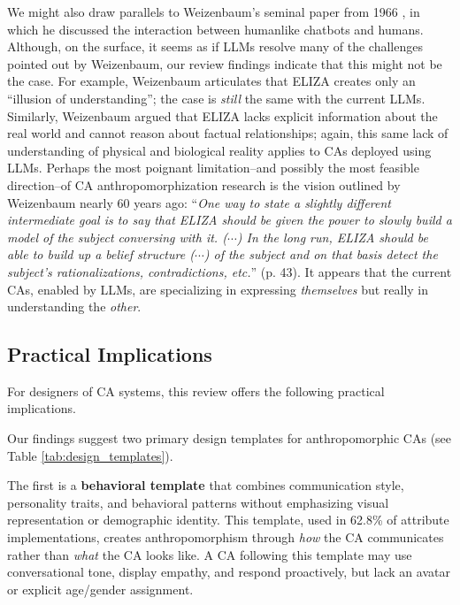 \documentclass[manuscript,anonymous,sigconf]{acmart}
\begin{document}
We might also draw parallels to Weizenbaum's seminal paper from 1966 \citep{weizenbaum_elizacomputer_1966}, in which he discussed the interaction between humanlike chatbots and humans. Although, on the surface, it seems as if LLMs resolve many of the challenges pointed out by Weizenbaum, our review findings indicate that this might not be the case. For example, Weizenbaum articulates that ELIZA creates only an ``illusion of understanding''; the case is \textit{still} the same with the current LLMs. Similarly, Weizenbaum argued that ELIZA lacks explicit information about the real world and cannot reason about factual relationships; again, this same lack of understanding of physical and biological reality applies to CAs deployed using LLMs. Perhaps the most poignant limitation--and possibly the most feasible direction--of CA anthropomorphization research is the vision outlined by Weizenbaum nearly 60 years ago: ``\textit{One way to state a slightly different intermediate goal is to say that ELIZA should be given the power to slowly build a model of the subject conversing with it. ($\cdots$) In the long run, ELIZA should be able to build up a belief structure ($\cdots$) of the subject and on that basis detect the subject's rationalizations, contradictions, etc.}'' (p. 43). It appears that the current CAs, enabled by LLMs, are specializing in expressing \textit{themselves} but really in understanding the \textit{other}.



\subsection{Practical Implications}

For designers of CA systems, this review offers the following practical implications.

Our findings suggest two primary design templates for anthropomorphic CAs (see Table \ref{tab:design_templates}). 

The first is a \textbf{behavioral template} that combines communication style, personality traits, and behavioral patterns without emphasizing visual representation or demographic identity. This template, used in 62.8\% of attribute implementations, creates anthropomorphism through \textit{how} the CA communicates rather than \textit{what} the CA looks like. A CA following this template may use conversational tone, display empathy, and respond proactively, but lack an avatar or explicit age/gender assignment. 
\end{document}
